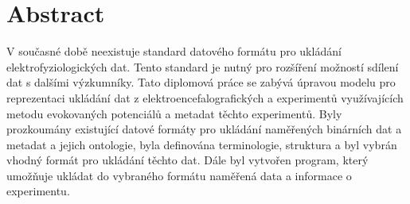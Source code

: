 \chapter* {Abstract}
\thispagestyle{empty}
V současné době neexistuje standard datového formátu pro ukládání elektrofyziologických dat. Tento standard je nutný pro rozšíření možností sdílení dat s dalšími výzkumníky. Tato diplomová práce se zabývá úpravou modelu pro reprezentaci ukládání dat z elektroencefalografických a experimentů využívajících metodu evokovaných potenciálů a metadat těchto experimentů. Byly prozkoumány existující datové formáty pro ukládání naměřených binárních dat a metadat a jejich ontologie, byla definována terminologie, struktura a byl vybrán vhodný formát pro ukládání těchto dat. Dále byl vytvořen program, který umožňuje ukládat do vybraného formátu naměřená data a informace o experimentu. 
